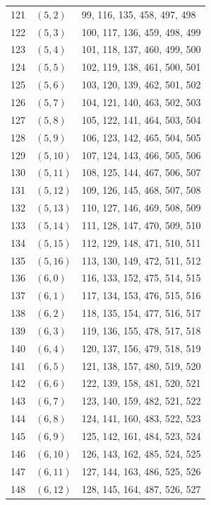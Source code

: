 \documentclass{article}
\begin{document}
\begin{longtable}{lll}
  121 & \((5, 2)\) & 99, 116, 135, 458, 497, 498 \\
  122 & \((5, 3)\) & 100, 117, 136, 459, 498, 499 \\
  123 & \((5, 4)\) & 101, 118, 137, 460, 499, 500 \\
  124 & \((5, 5)\) & 102, 119, 138, 461, 500, 501 \\
  125 & \((5, 6)\) & 103, 120, 139, 462, 501, 502 \\
  126 & \((5, 7)\) & 104, 121, 140, 463, 502, 503 \\
  127 & \((5, 8)\) & 105, 122, 141, 464, 503, 504 \\
  128 & \((5, 9)\) & 106, 123, 142, 465, 504, 505 \\
  129 & \((5, 10)\) & 107, 124, 143, 466, 505, 506 \\
  130 & \((5, 11)\) & 108, 125, 144, 467, 506, 507 \\
  131 & \((5, 12)\) & 109, 126, 145, 468, 507, 508 \\
  132 & \((5, 13)\) & 110, 127, 146, 469, 508, 509 \\
  133 & \((5, 14)\) & 111, 128, 147, 470, 509, 510 \\
  134 & \((5, 15)\) & 112, 129, 148, 471, 510, 511 \\
  135 & \((5, 16)\) & 113, 130, 149, 472, 511, 512 \\
  136 & \((6, 0)\) & 116, 133, 152, 475, 514, 515 \\
  137 & \((6, 1)\) & 117, 134, 153, 476, 515, 516 \\
  138 & \((6, 2)\) & 118, 135, 154, 477, 516, 517 \\
  139 & \((6, 3)\) & 119, 136, 155, 478, 517, 518 \\
  140 & \((6, 4)\) & 120, 137, 156, 479, 518, 519 \\
  141 & \((6, 5)\) & 121, 138, 157, 480, 519, 520 \\
  142 & \((6, 6)\) & 122, 139, 158, 481, 520, 521 \\
  143 & \((6, 7)\) & 123, 140, 159, 482, 521, 522 \\
  144 & \((6, 8)\) & 124, 141, 160, 483, 522, 523 \\
  145 & \((6, 9)\) & 125, 142, 161, 484, 523, 524 \\
  146 & \((6, 10)\) & 126, 143, 162, 485, 524, 525 \\
  147 & \((6, 11)\) & 127, 144, 163, 486, 525, 526 \\
  148 & \((6, 12)\) & 128, 145, 164, 487, 526, 527 \\

\end{longtable}
\end{document}
